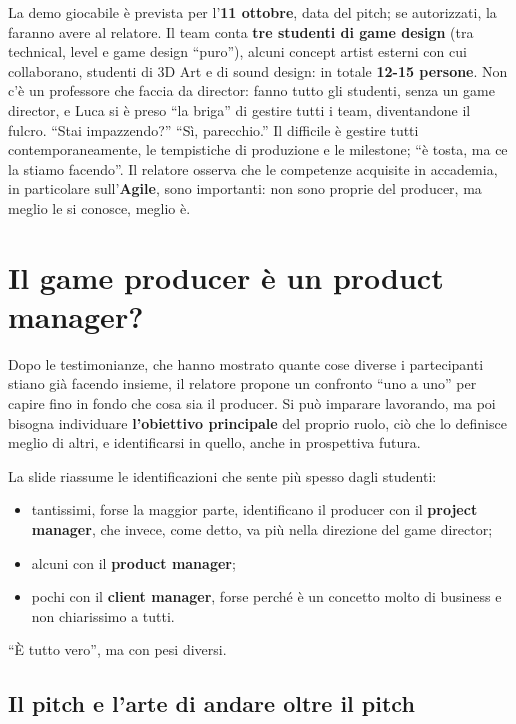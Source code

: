 La demo giocabile è prevista per l'\textbf{11 ottobre}, data del pitch; se
autorizzati, la faranno avere al relatore. Il team conta \textbf{tre studenti di
game design} (tra technical, level e game design ``puro''), alcuni concept
artist esterni con cui collaborano, studenti di 3D Art e di sound design: in
totale \textbf{12-15 persone}. Non c'è un professore che faccia da director:
fanno tutto gli studenti, senza un game director, e Luca si è preso ``la briga''
di gestire tutti i team, diventandone il fulcro. ``Stai impazzendo?'' ``Sì,
parecchio.'' Il difficile è gestire tutti contemporaneamente, le tempistiche di
produzione e le milestone; ``è tosta, ma ce la stiamo facendo''. Il relatore
osserva che le competenze acquisite in accademia, in particolare
sull'\textbf{Agile}, sono importanti: non sono proprie del producer, ma meglio le
si conosce, meglio è.

\section{Il game producer è un product manager?}
\label{sec:z5-product-manager}

Dopo le testimonianze, che hanno mostrato quante cose diverse i partecipanti
stiano già facendo insieme, il relatore propone un confronto ``uno a uno'' per
capire fino in fondo che cosa sia il producer. Si può imparare lavorando, ma poi
bisogna individuare \textbf{l'obiettivo principale} del proprio ruolo, ciò che lo
definisce meglio di altri, e identificarsi in quello, anche in prospettiva
futura.

La slide riassume le identificazioni che sente più spesso dagli studenti:
\begin{itemize}
  \item tantissimi, forse la maggior parte, identificano il producer con il
        \textbf{project manager}, che invece, come detto, va più nella direzione
        del game director;
  \item alcuni con il \textbf{product manager};
  \item pochi con il \textbf{client manager}, forse perché è un concetto molto
        di business e non chiarissimo a tutti.
\end{itemize}
``È tutto vero'', ma con pesi diversi.

\subsection{Il pitch e l'arte di andare oltre il pitch}


